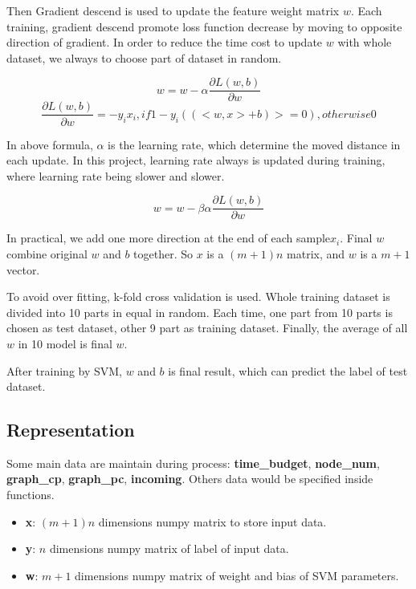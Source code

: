\documentclass[conference,compsoc]{IEEEtran}
\begin{document}
Then Gradient descend is used to update the feature weight matrix $w$. Each
training, gradient descend promote loss function decrease by moving to
opposite direction of gradient. In order to reduce the time cost to update
$w$ with whole dataset, we always to choose part of dataset in random.

$$ w = w -\alpha\frac{\partial L(w,b)}{\partial w}$$
$$ \frac{\partial L(w,b)}{\partial w} = -y_i x_i, if 1-y_i((<w,x>+b)>=0), otherwise 0$$

In above formula, $\alpha$ is the learning rate,
which determine the moved distance in each update. In this project, learning
rate always is updated during training, where learning rate being slower and
slower.

$$w = w -\beta \alpha \frac{\partial L(w,b)}{\partial w}$$

In practical, we add one more direction at the end of each sample$x_i$.
Final $w$ combine original $w$ and $b$ together. So $x$ is a $(m+1)n$ matrix,
and $w$ is a $m+1$ vector.

To avoid over fitting, k-fold cross validation is used. Whole training dataset
is divided into 10 parts in equal in random. Each time, one part from 10 parts
is chosen as test dataset, other 9 part as training dataset. Finally, the
average of all $w$ in 10 model is final $w$.

After training by SVM, $w$ and $b$ is final result, which can predict the label
of test dataset.

\subsection{Representation}
Some main data are maintain during process: \textbf{time\_budget},
\textbf{node\_num}, \textbf{graph\_cp}, \textbf{graph\_pc}, \textbf{incoming}.
Others data would be specified inside functions.

\begin{itemize}
	\item \textbf{x}: $(m+1)n$ dimensions numpy matrix to store input data.
  \item \textbf{y}: $n$ dimensions numpy matrix of label of input data.
  \item \textbf{w}: $m+1$ dimensions numpy matrix of weight and bias of SVM
	  parameters.
\end{itemize}
\end{document}
